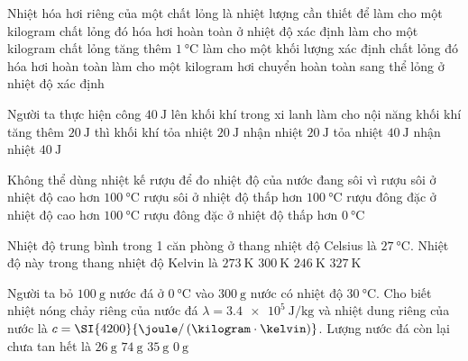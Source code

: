 \begin{ex}
	Nhiệt hóa hơi riêng của một chất lỏng là nhiệt lượng cần thiết để
	\choice
	{\True làm cho một kilogram chất lỏng đó hóa hơi hoàn toàn ở nhiệt độ xác định}
	{làm cho một kilogram chất lỏng tăng thêm $\SI{1}{\celsius}$}
	{làm cho một khối lượng xác định chất lỏng đó hóa hơi hoàn toàn}
	{làm cho một kilogram hơi chuyển hoàn toàn sang thể lỏng ở nhiệt độ xác định}
	\loigiai{}
\end{ex}
\begin{ex}
	Người ta thực hiện công $\SI{40}{\joule}$ lên khối khí trong xi lanh làm cho nội năng khối khí tăng thêm $\SI{20}{\joule}$ thì khối khí
	\choice
	{\True tỏa nhiệt $\SI{20}{\joule}$}
	{nhận nhiệt $\SI{20}{\joule}$}
	{tỏa nhiệt $\SI{40}{\joule}$}
	{nhận nhiệt $\SI{40}{\joule}$}
	\loigiai{}
\end{ex}
\begin{ex}
	Không thể dùng nhiệt kế rượu để đo nhiệt độ của nước đang sôi vì
	\choice
	{rượu sôi ở nhiệt độ cao hơn $\SI{100}{\celsius}$}
	{\True rượu sôi ở nhiệt độ thấp hơn $\SI{100}{\celsius}$}
	{rượu đông đặc ở nhiệt độ cao hơn $\SI{100}{\celsius}$}
	{rượu đông đặc ở nhiệt độ thấp hơn $\SI{0}{\celsius}$}
	\loigiai{}
\end{ex}
\begin{ex}
	Nhiệt độ trung bình trong 1 căn phòng ở thang nhiệt độ Celsius là $\SI{27}{\celsius}$. Nhiệt độ này trong thang nhiệt độ Kelvin là
	\choice
	{$\SI{273}{\kelvin}$}
	{\True $\SI{300}{\kelvin}$}
	{$\SI{246}{\kelvin}$}
	{$\SI{327}{\kelvin}$}
	\loigiai{}
\end{ex}
\begin{ex}
	Người ta bỏ $\SI{100}{\gram}$ nước đá ở $\SI{0}{\celsius}$ vào $\SI{300}{\gram}$ nước có nhiệt độ $\SI{30}{\celsius}$. Cho biết nhiệt nóng chảy riêng của nước đá $\lambda=\SI{3.4e5}{\joule/\kilogram}$ và nhiệt dung riêng của nước là $c =\SI{4200}{\joule/\left(\kilogram\cdot\kelvin\right)}$. Lượng nước đá còn lại chưa tan hết là
	\choice
	{$\SI{26}{\gram}$}
	{$\SI{74}{\gram}$}
	{$\SI{35}{\gram}$}
	{\True $\SI{0}{\gram}$}
\end{ex}
